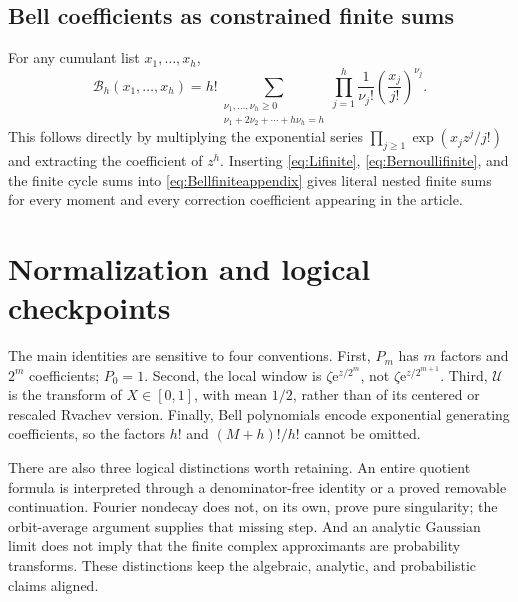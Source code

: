 \documentclass[11pt,letterpaper]{article}
\numberwithin{equation}{section}
\theoremstyle{definition}
\theoremstyle{remark}
\newcommand{\B}{\mathcal B}
\newcommand{\Up}{\mathcal U}
\newcommand{\e}{\mathrm e}
\begin{document}
\subsection{Bell coefficients as constrained finite sums}
For any cumulant list \(x_1,\ldots,x_h\),
\begin{equation}
 \B_h(x_1,\ldots,x_h)
 =h!\sum_{\substack{\nu_1,\ldots,\nu_h\geq0\\
                         \nu_1+2\nu_2+\cdots+h\nu_h=h}}
         \prod_{j=1}^h\frac1{\nu_j!}
                              \left(\frac{x_j}{j!}\right)^{\nu_j}.
 \label{eq:Bellfiniteappendix}
\end{equation}
This follows directly by multiplying the exponential series
\(\prod_{j\geq1}\exp(x_jz^j/j!)\) and extracting the coefficient of \(z^h\). Inserting \eqref{eq:Lifinite}, \eqref{eq:Bernoullifinite}, and the finite cycle sums into \eqref{eq:Bellfiniteappendix} gives literal nested finite sums for every moment and every correction coefficient appearing in the article.

\section{Normalization and logical checkpoints}
The main identities are sensitive to four conventions. First, \(P_m\) has \(m\) factors and \(2^m\) coefficients; \(P_0=1\). Second, the local window is \(\zeta\e^{z/2^m}\), not \(\zeta\e^{z/2^{m+1}}\). Third, \(\Up\) is the transform of \(X\in[0,1]\), with mean \(1/2\), rather than of its centered or rescaled Rvachev version. Finally, Bell polynomials encode exponential generating coefficients, so the factors \(h!\) and \((M+h)!/h!\) cannot be omitted.

There are also three logical distinctions worth retaining. An entire quotient formula is interpreted through a denominator-free identity or a proved removable continuation. Fourier nondecay does not, on its own, prove pure singularity; the orbit-average argument supplies that missing step. And an analytic Gaussian limit does not imply that the finite complex approximants are probability transforms. These distinctions keep the algebraic, analytic, and probabilistic claims aligned.
\end{document}
